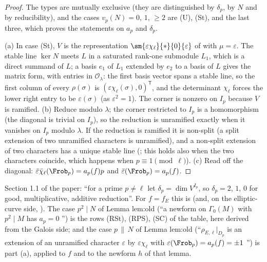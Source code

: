 \begin{proof}
The types are mutually exclusive (they are distinguished by $\delta_p$, by $N$ and by reducibility), and the cases $v_p(N)=0$, $1$, $\ge2$ are (U), (St),
and the last three, which proves the statements on $a_p$ and $\delta_p$.

(a) In case (St), $V$ is the representation $\sm{\varepsilon\chi_\ell}{*}{0}{\varepsilon}$ of  with $\mu=\varepsilon$. The stable line $\ker N$ meets $L$ in
a saturated rank-one submodule $L_1$, which is a direct summand of $L$; a basis $e_1$ of $L_1$ extended by $e_2$ to a basis of $L$ gives the matrix
form, with entries in $\mathcal{O}_\lambda$: the first basis vector spans a stable line, so the first column of every $\rho(\sigma)$ is $(\varepsilon\chi_\ell(\sigma),0)^{\mathsf T}$, and the
determinant $\chi_\ell$ forces the lower right entry to be $\varepsilon(\sigma)$ (as $\varepsilon^2=1$). The corner is nonzero on $I_p$ because $V$ is ramified. (b) Reduce modulo $\lambda$; the corner restricted to $I_p$ is a homomorphism (the diagonal is trivial on $I_p$), so the
reduction is unramified exactly when it vanishes on $I_p$ modulo $\lambda$. If the reduction is ramified it is non-split (a split extension of two
unramified characters is unramified), and a non-split extension of two characters has a unique stable line (; this holds also
when the two characters coincide, which happens when $p\equiv1\pmod\ell$). (c) Read off the diagonal: $\bar\varepsilon\bar\chi_\ell(\Frob_p)=a_p(f)p$ and $\bar\varepsilon(\Frob_p)=a_p(f)$.
\end{proof}

\begin{paperlink}
Section 1.1 of the paper: ``for a prime $p\ne\ell$ let $\delta_p=\dim V^{I_p}$, so $\delta_p=2$, $1$, $0$ for good, multiplicative, additive reduction''. For $f=f_E$ this is
 (and, on the elliptic-curve side, ). The case $p^2\mid N$ of Lemma lem:old (``a newform on $\Gamma_0(M)$ with $p^2\mid M$
has $a_p=0$ \cite[Theorem 3]{AtkinLehner70}'') is the rows (RSt), (RPS), (SC) of the table, here derived from the Galois side; and the case $p\,\|\,N$ of
Lemma lem:old (``$\rho_{E,\ell}|_{D_p}$ is an extension of an unramified character $\varepsilon$ by $\varepsilon\chi_\ell$ with $\varepsilon(\Frob_p)=a_p(f)=\pm1$ \cite[Theorem 3.1(e)]{DDT}'') is
part (a), applied to $f$ and to the newform $h$ of that lemma.
\end{paperlink}

